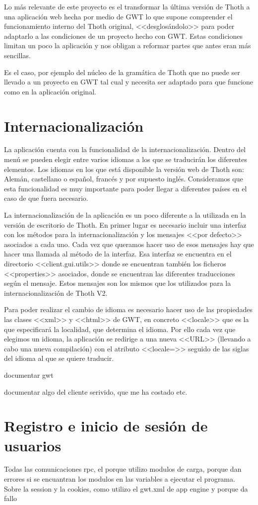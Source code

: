 
Lo más relevante de este proyecto es el transformar la última versión de Thoth a una aplicación web hecha por medio de GWT lo que supone comprender el funcionamiento interno del Thoth original, <<desglosándolo>> para poder adaptarlo a las condiciones de un proyecto hecho con GWT.
Estas condiciones limitan un poco la aplicación y nos obligan a reformar partes que antes eran más sencillas.

Es el caso, por ejemplo del núcleo de la gramática de Thoth que no puede ser llevado a un proyecto en GWT tal cual y necesita ser adaptado para que funcione como en la aplicación original.




\section{Internacionalización}
La aplicación cuenta con la funcionalidad de la internacionalización. Dentro del menú se pueden elegir entre varios idiomas a los que se traducirán los diferentes elementos. Los idiomas en los que está disponible la versión web de Thoth son: Alemán, castellano o español, francés y por supuesto inglés. Consideramos que esta funcionalidad es muy importante para poder llegar a diferentes países en el caso de que fuera necesario.

La internacionalización de la aplicación es un poco diferente a la utilizada en la versión de escritorio de Thoth. En primer lugar es necesario incluir una interfaz con los métodos para la internacionalización y los mensajes <<por defecto>> asociados a cada uno. Cada vez que queramos hacer uso de esos mensajes hay que hacer una llamada al método de la interfaz. Esa interfaz se encuentra en el directorio <<client.gui.utils>> donde se encuentran también los ficheros <<properties>> asociados, donde se encuentran las diferentes traducciones según el mensaje. Estos mensajes son los mismos que los utilizados para la internacionalización de Thoth V2.

Para poder realizar el cambio de idioma es necesario hacer uso de las propiedades las clases <<xml>> y <<html>> de GWT, en concreto <<locale>> que es la que especificará la localidad, que determina el idioma. Por ello cada vez que elegimos un idioma, la aplicación se redirige a una nueva <<URL>> (llevando a cabo una nueva compilación) con el atributo <<locale=>> seguido de las siglas del idioma al que se quiere traducir.


documentar gwt 
 
 
 
 documentar algo del cliente serivido, que me ha costado etc.



\section{Registro e inicio de sesión de usuarios}
Todas las comunicaciones rpc, el porque utilizo modulos de carga, porque dan errores si se encuantran los modulos en las variables a ejecutar el programa.
Sobre la session y la cookies, como utilizo el gwt.xml de app engine y porque da fallo
